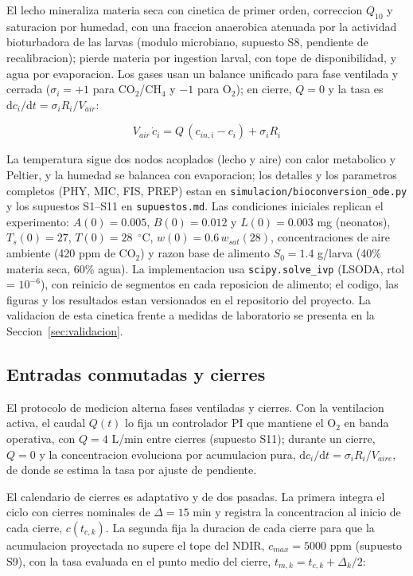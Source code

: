 El lecho mineraliza materia seca con cinetica de primer orden, correccion
$Q_{10}$ y saturacion por humedad, con una fraccion anaerobica atenuada por
la actividad bioturbadora de las larvas (modulo microbiano, supuesto S8,
pendiente de recalibracion); pierde materia por ingestion larval, con tope
de disponibilidad, y agua por evaporacion. Los gases usan un balance
unificado para fase ventilada y cerrada ($\sigma_i = +1$ para CO$_2$/CH$_4$
y $-1$ para O$_2$); en cierre, $Q = 0$ y la tasa es
$\mathrm{d}c_i/\mathrm{d}t = \sigma_i R_i/V_{air}$:

\begin{equation}
  V_{air}\,\dot{c}_i = Q\,(c_{in,i} - c_i) + \sigma_i R_i
\end{equation}

La temperatura sigue dos nodos acoplados (lecho y aire) con calor
metabolico y Peltier, y la humedad se balancea con evaporacion; los
detalles y los parametros completos (PHY, MIC, FIS, PREP) estan en
\texttt{simulacion/bioconversion\_ode.py} y los supuestos S1--S11 en
\texttt{supuestos.md}. Las condiciones iniciales replican el experimento:
$A(0) = 0.005$, $B(0) = 0.012$ y $L(0) = 0.003$ mg (neonatos), $T_s(0) = 27$,
$T(0) = 28$~$^{\circ}$C, $w(0) = 0.6\,w_{sat}(28)$, concentraciones de aire
ambiente (420 ppm de CO$_2$) y razon base de alimento $S_0 = 1.4$ g/larva
(40\% materia seca, 60\% agua). La implementacion usa
\texttt{scipy.solve\_ivp} (LSODA, rtol = $10^{-6}$), con reinicio de
segmentos en cada reposicion de alimento; el codigo, las figuras y los
resultados estan versionados en el repositorio del proyecto. La validacion
de esta cinetica frente a medidas de laboratorio se presenta en la
Seccion~\ref{sec:validacion}.

\subsection{Entradas conmutadas y cierres}

El protocolo de medicion alterna fases ventiladas y cierres. Con la
ventilacion activa, el caudal $Q(t)$ lo fija un controlador PI que mantiene
el O$_2$ en banda operativa, con $Q = 4$ L/min entre cierres (supuesto S11);
durante un cierre, $Q = 0$ y la concentracion evoluciona por acumulacion
pura, $\mathrm{d}c_i/\mathrm{d}t = \sigma_i R_i/V_{aire}$, de donde se estima
la tasa por ajuste de pendiente.

El calendario de cierres es adaptativo y de dos pasadas. La primera integra
el ciclo con cierres nominales de $\Delta = 15$ min y registra la
concentracion al inicio de cada cierre, $c(t_{c,k})$. La segunda fija la
duracion de cada cierre para que la acumulacion proyectada no supere el tope
del NDIR, $c_{max} = 5000$ ppm (supuesto S9), con la tasa evaluada en el
punto medio del cierre, $t_{m,k} = t_{c,k} + \Delta_k/2$:

